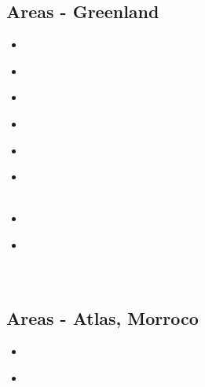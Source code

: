 \subsection{Areas - Greenland}

\begin{scriptsize}
\begin{itemize}
\item[\nineteenninetyseven]
\textcite{grev97} \\
\item[\twothousandeleven]
\textcite{scwo11} \\
\item[\twothousandtwelve]
\textcite{sakm12} \\
\item[\twothousandthirteen]
\textcite{raab13} \\
\item[\twothousandfourteen]
\textcite{moad14} \\
\item[\twothousandfifteen]
\textcite{stsj15} \\
\textcite{heps15} \\
\item[\twothousandseventeen]
\textcite{gors17} \\
\item[\twothousandnineteen]
\textcite{stbl19} \\
\textcite{kudd19} \\
\textcite{kuwd19} \\
\end{itemize}
\end{scriptsize}

\subsection{Areas - Atlas, Morroco}

\begin{scriptsize}
\begin{itemize}
\item[\twothousandtwelve]
\textcite{mica12} \\
\item[\twothousandfourteen]
\textcite{kava14} \\
\end{itemize}
\end{scriptsize}

